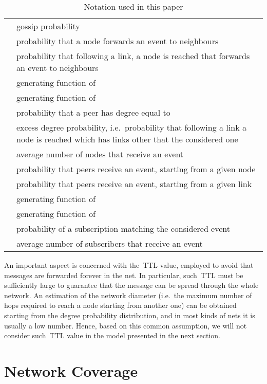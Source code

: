 \documentclass[10pt, conference, compsocconf]{IEEEtran}
\begin{document}
\begin{table}[t]
\centering \begin{tabular}{rp{}}
\toprule
 & gossip probability\\
 & probability that a node forwards an event to  neighbours\\
 & probability that following a link, a node is reached that forwards an event to  neighbours\\
 & generating function of \\
 & generating function of \\
 & probability that a peer has degree equal to \\
 & excess degree probability, i.e.~probability that following a link a node is reached which has  links other that the considered one\\
 & average number of nodes that receive an event\\
 & probability that  peers receive an event, starting from a given node\\
 & probability that  peers receive an event, starting from a given link\\
 & generating function of \\
 & generating function of \\
 & probability of a subscription matching the considered event\\
 & average number of subscribers that receive an event\\
\bottomrule
\end{tabular}
\caption{Notation used in this paper}\label{tab:notation}
\end{table}

An important aspect is concerned with the~\ac{TTL} value, employed to avoid that messages are forwarded forever in the net. In particular, such~\ac{TTL} must be sufficiently large to guarantee that the message can be spread through the whole network.
An estimation of the network diameter (i.e.~the maximum number of hops required to reach a node starting from another one) can be obtained starting from the degree probability distribution, and in most kinds of nets it is usually a low number.
Hence, based on this common assumption, we will not consider such~\ac{TTL} value in the model presented in the next section. 

\section{Network Coverage}\label{sec:cn}
\end{document}
